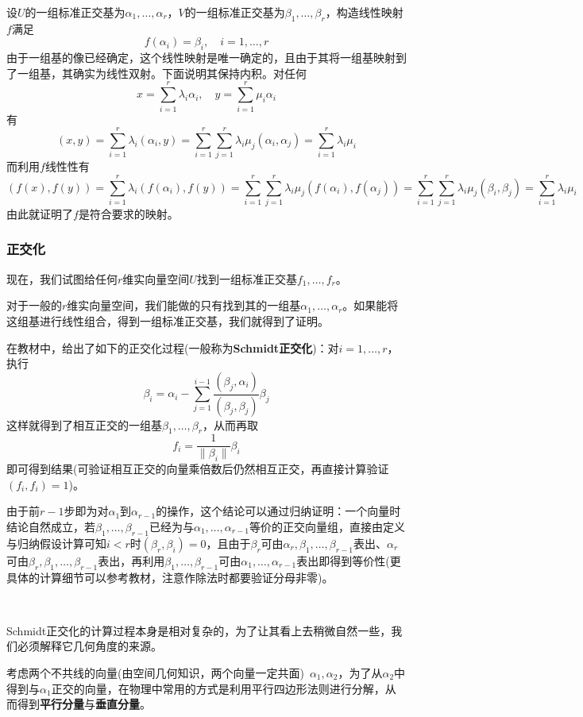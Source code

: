 \documentclass[a4paper,UTF8,fontset=windows]{ctexart}
\begin{document}
设$U$的一组标准正交基为$\alpha_1,\dots,\alpha_r$，$V$的一组标准正交基为$\beta_1,\dots,\beta_r$，构造线性映射$f$满足
$$f(\alpha_i)=\beta_i,\quad i=1,\dots,r$$
由于一组基的像已经确定，这个线性映射是唯一确定的，且由于其将一组基映射到了一组基，其确实为线性双射。下面说明其保持内积。对任何
$$x=\sum_{i=1}^r\lambda_i\alpha_i,\quad y=\sum_{i=1}^r\mu_i\alpha_i$$
有
$$(x,y)=\sum_{i=1}^r\lambda_i(\alpha_i,y)=\sum_{i=1}^r\sum_{j=1}^r\lambda_i\mu_j(\alpha_i,\alpha_j)=\sum_{i=1}^r\lambda_i\mu_i$$
而利用$f$线性性有
$$(f(x),f(y))=\sum_{i=1}^r\lambda_i(f(\alpha_i),f(y))=\sum_{i=1}^r\sum_{j=1}^r\lambda_i\mu_j(f(\alpha_i),f(\alpha_j))=\sum_{i=1}^r\sum_{j=1}^r\lambda_i\mu_j(\beta_i,\beta_j)=\sum_{i=1}^r\lambda_i\mu_i$$
由此就证明了$f$是符合要求的映射。

\subsubsection{正交化}
现在，我们试图给任何$r$维实向量空间$U$找到一组标准正交基$f_1,\dots,f_r$。

对于一般的$r$维实向量空间，我们能做的只有找到其的一组基$\alpha_1,\dots,\alpha_r$。如果能将这组基进行线性组合，得到一组标准正交基，我们就得到了证明。

在教材中，给出了如下的正交化过程(一般称为\textbf{Schmidt正交化})：对$i=1,\dots,r$，执行
$$\beta_i=\alpha_i-\sum_{j=1}^{i-1}\frac{(\beta_j,\alpha_i)}{(\beta_j,\beta_j)}\beta_j$$
这样就得到了相互正交的一组基$\beta_1,\dots,\beta_r$，从而再取
$$f_i=\frac{1}{\|\beta_i\|}\beta_i$$
即可得到结果(可验证相互正交的向量乘倍数后仍然相互正交，再直接计算验证$(f_i,f_i)=1$)。

由于前$r-1$步即为对$\alpha_1$到$\alpha_{r-1}$的操作，这个结论可以通过归纳证明：一个向量时结论自然成立，若$\beta_1,\dots,\beta_{r-1}$已经为与$\alpha_1,\dots,\alpha_{r-1}$等价的正交向量组，直接由定义与归纳假设计算可知$i<r$时$(\beta_r,\beta_i)=0$，且由于$\beta_r$可由$\alpha_r,\beta_1,\dots,\beta_{r-1}$表出、$\alpha_r$可由$\beta_r,\beta_1,\dots,\beta_{r-1}$表出，再利用$\beta_1,\dots,\beta_{r-1}$可由$\alpha_1,\dots,\alpha_{r-1}$表出即得到等价性(更具体的计算细节可以参考教材，注意作除法时都要验证分母非零)。

\

Schmidt正交化的计算过程本身是相对复杂的，为了让其看上去稍微自然一些，我们必须解释它几何角度的来源。

考虑两个不共线的向量(由空间几何知识，两个向量一定共面)\ $\alpha_1,\alpha_2$，为了从$\alpha_2$中得到与$\alpha_1$正交的向量，在物理中常用的方式是利用平行四边形法则进行分解，从而得到\textbf{平行分量}与\textbf{垂直分量}。
\end{document}
